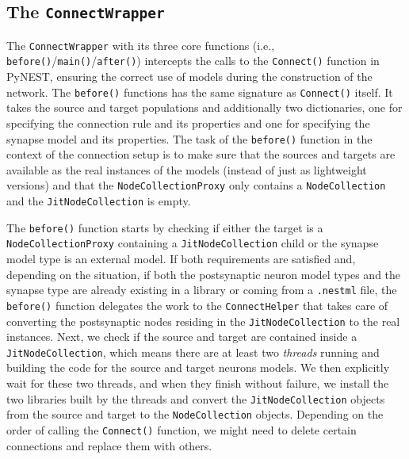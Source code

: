 \subsection{The \texttt{ConnectWrapper}}

The \texttt{ConnectWrapper} with its three core functions (i.e., \texttt{before()}/\texttt{main()}/\texttt{after()}) intercepts the calls to the \texttt{Connect()} function in PyNEST, ensuring the correct use of models during the construction of the network. The \texttt{before()} functions has the same signature as \texttt{Connect()} itself. It takes the source and target populations and additionally two dictionaries, one for specifying the connection rule and its properties and one for specifying the synapse model and its properties. The task of the \texttt{before()} function in the context of the connection setup is to make sure that the sources and targets are available as the real instances of the models (instead of just as lightweight versions) and that the \texttt{NodeCollectionProxy} only contains a \texttt{NodeCollection} and the \texttt{JitNodeCollection} is empty.

The \texttt{before()} function starts by checking if either the target is a \texttt{NodeCollectionProxy} containing a \texttt{JitNodeCollection} child or the synapse model type is an external model. If both requirements are satisfied and, depending on the situation, if both the postsynaptic neuron model types and the synapse type are already existing in a library or coming from a \texttt{.nestml} file, the \texttt{before()} function delegates the work to the \texttt{ConnectHelper} that takes care of converting the postsynaptic nodes residing in the \texttt{JitNodeCollection} to the real instances. Next, we check if the source and target are contained inside a \texttt{JitNodeCollection}, which means there are at least two \emph{threads} running and building the code for the source and target neurons models. We then explicitly wait for these two threads, and when they finish without failure, we install the two libraries built by the threads and convert the \texttt{JitNodeCollection} objects from the source and target to the \texttt{NodeCollection} objects. Depending on the order of calling the \texttt{Connect()} function, we might need to delete certain connections and replace them with others.

